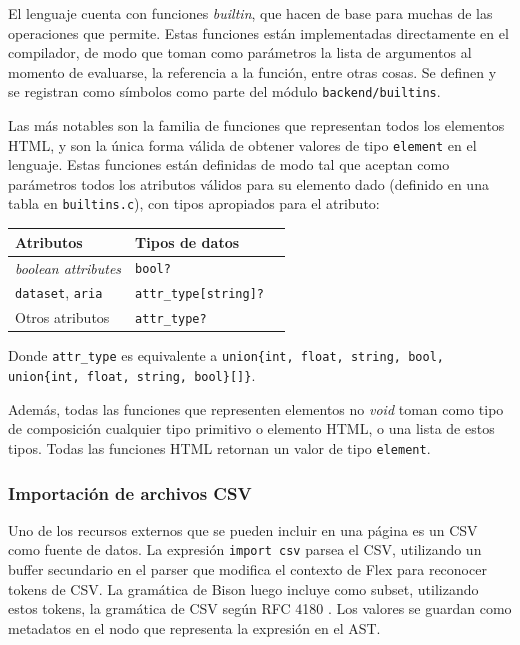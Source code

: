 El lenguaje cuenta con funciones \textit{builtin}, que hacen de base para muchas de las operaciones que permite. Estas funciones están implementadas directamente en el compilador, de modo que toman como parámetros la lista de argumentos al momento de evaluarse, la referencia a la función, entre otras cosas. Se definen y se registran como símbolos como parte del módulo \texttt{backend/builtins}.

Las más notables son la familia de funciones que representan todos los elementos HTML, y son la única forma válida de obtener valores de tipo \texttt{element} en el lenguaje. Estas funciones están definidas de modo tal que aceptan como parámetros todos los atributos válidos para su elemento dado (definido en una tabla en \texttt{builtins.c}), con tipos apropiados para el atributo:

\begin{table}[H]
\centering
\begin{tabular}{|l|l|l|}
\hline
\textbf{Atributos}                                          & \textbf{Tipos de datos}           \\ \hline
\textit{boolean attributes} \cite{mdn:boolean_attributes}   & \texttt{bool?}                    \\ \hline
\texttt{dataset}, \texttt{aria}                             & \texttt{attr\_type{[}string{]}?}  \\ \hline
Otros atributos                                             & \texttt{attr\_type?}              \\ \hline
\end{tabular}
\end{table}

Donde \texttt{attr\_type} es equivalente a \texttt{union\{int, float, string, bool, union\{int, float, string, bool\}[]\}}.

Además, todas las funciones que representen elementos no \textit{void} \cite{mdn:void_element} toman como tipo de composición cualquier tipo primitivo o elemento HTML, o una lista de estos tipos. Todas las funciones HTML retornan un valor de tipo \texttt{element}.

\subsubsection{Importación de archivos CSV}\label{subsub:csv_import}

Uno de los recursos externos que se pueden incluir en una página es un CSV como fuente de datos. La expresión \texttt{import csv} parsea el CSV, utilizando un buffer secundario en el parser que modifica el contexto de Flex para reconocer tokens de CSV. La gramática de Bison luego incluye como subset, utilizando estos tokens, la gramática de CSV según RFC 4180 \cite{rfc:4180_csv}. Los valores se guardan como metadatos en el nodo que representa la expresión en el AST.


